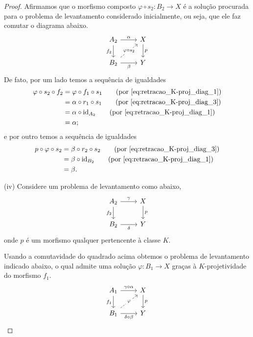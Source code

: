 \begin{proof}
  Afirmamos que o morfismo composto $\varphi \circ s_2: B_2 \to X$ é a solução procurada para o problema de levantamento considerado inicialmente, ou seja, que ele faz comutar o diagrama abaixo.
  \begin{displaymath}
    \begin{tikzcd}
      A_2
      \arrow[r, "\alpha"]
      \arrow[d, "f_2" swap]
      & X
      \arrow[d, "p"]
      \\ B_2
      \arrow[r, "\beta" swap]
      \arrow[ru, dashed, "\varphi \circ s_2" description]
      & Y
    \end{tikzcd}
  \end{displaymath}
  De fato, por um lado temos a sequência de igualdades
  \begin{align*}
    \varphi \circ s_2 \circ f_2
    & = \varphi \circ f_1 \circ s_1
    \tag{por \eqref{eq:retracao_K-proj_diag_1}} \\
    & = \alpha \circ r_1 \circ s_1
    \tag{por \eqref{eq:retracao_K-proj_diag_3}} \\
    & = \alpha \circ \id_{A_2}
    \tag{por \eqref{eq:retracao_K-proj_diag_1}} \\
    & = \alpha;
  \end{align*}
  e por outro temos a sequência de igualdades
  \begin{align*}
    p \circ \varphi \circ s_2
    & = \beta \circ r_2 \circ s_2
    \tag{por \eqref{eq:retracao_K-proj_diag_3}} \\
    & = \beta \circ \id_{B_2}
    \tag{por \eqref{eq:retracao_K-proj_diag_1}} \\
    & = \beta.
  \end{align*}

  \smallskip
  (iv) Considere um problema de levantamento como abaixo,
  \begin{equation}\label{eq:pushout_K-proj_diag_1}
    \begin{tikzcd}
      A_2
      \arrow[r, "\gamma"]
      \arrow[d, "f_2" swap]
      & X
      \arrow[d, "p"]
      \\ B_2
      \arrow[r, "\delta" swap]
      & Y
    \end{tikzcd}
  \end{equation}
  onde $p$ é um morfismo qualquer pertencente à classe $K$.

  Usando a comutavidade do quadrado acima obtemos o problema de levantamento indicado abaixo, o qual admite uma solução $\varphi: B_1 \to X$ graças à $K$-projetividade do morfismo $f_1$.
  \begin{equation}\label{eq:pushout_K-proj_diag_2}
    \begin{tikzcd}
      A_1
      \arrow[r, "\gamma \circ \alpha"]
      \arrow[d, "f_1" swap]
      & X
      \arrow[d, "p"]
      \\ B_1
      \arrow[r, "\delta \circ \beta" swap]
      \arrow[ru, dashed, "\varphi" description]
      & Y
    \end{tikzcd}
  \end{equation}


\end{proof}

